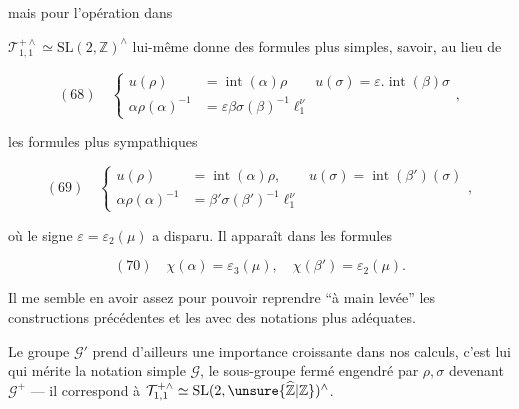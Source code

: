 


mais pour l'opération dans

$\mathcal T_{1,1}^{+\wedge}\simeq\mathrm{SL}(2,\mathbb Z)^{\wedge}$
lui-même donne des formules plus simples, savoir, au lieu de

\[
(68)\quad\left\{\begin{aligned}
u(\rho)&=\operatorname{int}(\alpha)\rho\qquad
u(\sigma)=\varepsilon.\operatorname{int}(\beta)\sigma\\
\alpha\rho(\alpha)^{-1}&=\varepsilon\beta\sigma(\beta)^{-1}\ell_1^\nu
\end{aligned}\right.,
\]

les formules plus sympathiques

\[
(69)\quad\left\{\begin{aligned}
u(\rho)&=\operatorname{int}(\alpha)\rho,\qquad
u(\sigma)=\operatorname{int}(\beta')(\sigma)\\
\alpha\rho(\alpha)^{-1}&=\beta'\sigma(\beta')^{-1}\ell_1^\nu
\end{aligned}\right.,
\]

où le signe $\varepsilon=\varepsilon_2(\mu)$ a disparu. Il apparaît dans les formules

\[
(70)\quad\chi(\alpha)=\varepsilon_3(\mu),\quad
\chi(\beta')=\varepsilon_2(\mu).
\]

Il me semble en avoir assez pour pouvoir reprendre ``à main levée'' les
constructions précédentes et les  avec des notations plus adéquates.

Le groupe $\mathcal G'$
prend d'ailleurs une importance croissante dans nos calculs, c'est lui qui mérite
 la notation simple $\mathcal G$, le sous-groupe fermé
engendré par $\rho,\sigma$ devenant $\mathcal G^{+}$ --- il correspond à
$\mathcal T_{1,1}^{+\wedge}\simeq\mathrm{SL}(2,\unsure{\widehat{\mathbb Z}|\mathbb Z})^{\wedge}$.

